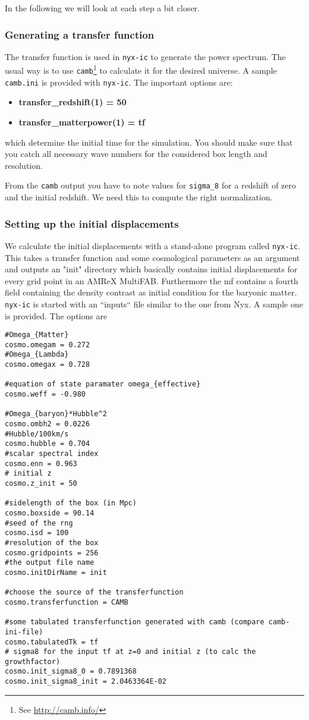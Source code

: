 In the following we will look at each step a bit closer.

\subsubsection{Generating a transfer function}

	The transfer function is used in \texttt{nyx-ic} to generate the power
	spectrum. The usual way is to use \texttt{camb}\footnote{See \url{http://camb.info/}}
	to calculate it for the desired universe. A sample \texttt{camb.ini} is
	provided with \texttt{nyx-ic}. The important options are: 
	\begin{itemize}
		\item {\bf transfer\_redshift(1) = 50}
		\item {\bf transfer\_matterpower(1) = tf} 		
	\end{itemize}

	which determine the initial time for the simulation. You should make sure
	that you catch all necessary wave numbers for the considered box length and
	resolution.
	
	From the \texttt{camb} output you have to note values for \texttt{sigma\_8}
	for a redshift of zero and the initial redshift. We need this to compute
	the right normalization.
	
\subsubsection{Setting up the initial displacements}
	
	We calculate the initial displacements with a stand-alone program called
	\texttt{nyx-ic}. This takes a transfer function and some cosmological parameters
	as an argument and outputs an "init" directory which basically contains initial
	displacements for every grid point in an AMReX MultiFAB. Furthermore the mf 
	contains a fourth field containing the density contrast as initial condition
	for the baryonic matter. \\
	\texttt{nyx-ic} is started with an ``inputs``
	file similar to the one from Nyx. A sample one is provided. The options are
\begin{verbatim}
#Omega_{Matter}
cosmo.omegam = 0.272
#Omega_{Lambda}
cosmo.omegax = 0.728

#equation of state paramater omega_{effective}
cosmo.weff = -0.980

#Omega_{baryon}*Hubble^2 
cosmo.ombh2 = 0.0226
#Hubble/100km/s
cosmo.hubble = 0.704
#scalar spectral index
cosmo.enn = 0.963
# initial z
cosmo.z_init = 50

#sidelength of the box (in Mpc)
cosmo.boxside = 90.14
#seed of the rng
cosmo.isd = 100
#resolution of the box
cosmo.gridpoints = 256
#the output file name
cosmo.initDirName = init

#choose the source of the transferfunction
cosmo.transferfunction = CAMB

#some tabulated transferfunction generated with camb (compare camb-ini-file)
cosmo.tabulatedTk = tf
# sigma8 for the input tf at z=0 and initial z (to calc the growthfactor)
cosmo.init_sigma8_0 = 0.7891368
cosmo.init_sigma8_init = 2.0463364E-02
\end{verbatim} 

